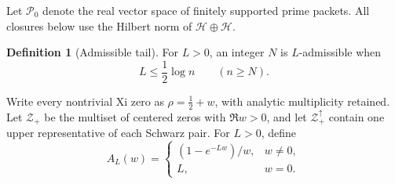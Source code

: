 \documentclass[11pt]{article}
\theoremstyle{definition}
\newtheorem{definition}[theorem]{Definition}
\theoremstyle{remark}
\newcommand{\cH}{\mathcal H}
\newcommand{\cP}{\mathcal P}
\newcommand{\cZ}{\mathcal Z}
\begin{document}
Let \(\cP_0\) denote the real vector space of finitely supported prime packets.  All closures
below use the Hilbert norm of \(\cH\oplus\cH\).

\begin{definition}[Admissible tail]
For \(L>0\), an integer \(N\) is \(L\)-admissible when
\[
 L\le\frac12\log n\qquad(n\ge N).
\]
\end{definition}

Write every nontrivial Xi zero as \(\rho=\frac12+w\), with analytic multiplicity retained.
Let \(\cZ_+\) be the multiset of centered zeros with \(\Re w>0\), and let
\(\cZ_+^\uparrow\) contain one upper representative of each Schwarz pair.  For \(L>0\), define
\[
 A_L(w)=
 \begin{cases}
  (1-e^{-Lw})/w,&w\ne0,\\
  L,&w=0.
 \end{cases}                                        \tag{2.1}
\]
\end{document}
